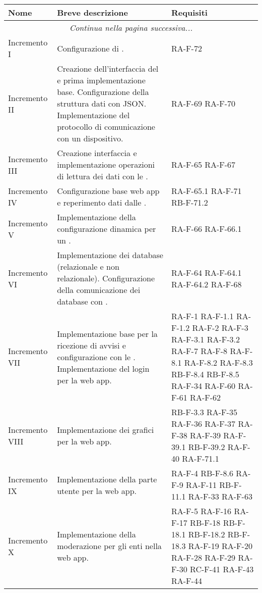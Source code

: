 \newpage
\begin{center}
	\begin{longtable}{|p{2.5cm}|p{6.5cm}|p{6cm}|}
	\hline
	\rowcolor{lighter-grayer}
	\textbf{Nome} & \textbf{Breve descrizione} & \textbf{Requisiti} \\
	\hline
	\endfirsthead
	\hline
    \multicolumn{3}{|c|}{\textit{Continua nella pagina successiva...}}\\
    \hline
    \endfoot
    \endlastfoot

	Incremento I	& Configurazione di \glock{Apache Kafka}. & RA-F-72 \\	\hline
	Incremento II & Creazione dell'interfaccia del \glock{gateway} e prima implementazione base. Configurazione della struttura dati con JSON. Implementazione del protocollo di comunicazione con un dispositivo. & RA-F-69 RA-F-70 \\	\hline
	Incremento III	& Creazione interfaccia \glock{API} e implementazione operazioni di lettura dei dati con le \glock{API}. & RA-F-65 RA-F-67 \\	\hline
	Incremento IV & Configurazione base web app e reperimento dati dalle \glock{API}. & RA-F-65.1 RA-F-71 RB-F-71.2 \\	\hline
	Incremento V	& Implementazione della configurazione dinamica per un \glock{gateway}. & RA-F-66 RA-F-66.1 \\	\hline
	Incremento VI & Implementazione dei database (relazionale e non relazionale). Configurazione della comunicazione dei database con \glock{Kafka}. & RA-F-64 RA-F-64.1 RA-F-64.2 RA-F-68 \\	\hline
	Incremento VII	& Implementazione base \glock{bot Telegram} per la ricezione di avvisi e configurazione con le \glock{API}. Implementazione del login per la web app. & RA-F-1 RA-F-1.1 RA-F-1.2 RA-F-2 RA-F-3 RA-F-3.1 RA-F-3.2 RA-F-7 RA-F-8 RA-F-8.1 RA-F-8.2 RA-F-8.3 RB-F-8.4 RB-F-8.5 RA-F-34 RA-F-60 RA-F-61 RA-F-62 \\	\hline
	Incremento VIII	& Implementazione dei grafici per la web app. &  RB-F-3.3 RA-F-35 RA-F-36 RA-F-37 RA-F-38 RA-F-39 RA-F-39.1 RB-F-39.2 RA-F-40 RA-F-71.1 \\	\hline
	Incremento IX	& Implementazione della parte utente per la web app. & RA-F-4 RB-F-8.6 RA-F-9 RA-F-11 RB-F-11.1 RA-F-33 RA-F-63 \\	\hline
	Incremento X	& Implementazione della moderazione per gli enti nella web app. & RA-F-5 RA-F-16 RA-F-17 RB-F-18 RB-F-18.1 RB-F-18.2 RB-F-18.3 RA-F-19 RA-F-20 RA-F-28 RA-F-29 RA-F-30  RC-F-41 RA-F-43 RA-F-44 \\	\hline

\end{longtable}
\end{center}
